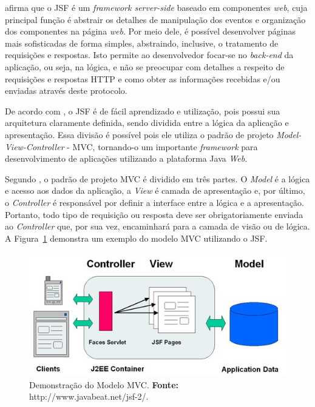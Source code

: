 \par {} afirma que o JSF é um
\textit{framework server-side} baseado em componentes \textit{web}, cuja principal função é abstrair os detalhes de manipulação dos eventos e organização dos componentes na página \textit{web}. 
Por meio dele, é possível desenvolver páginas mais sofisticadas de forma
simples, abstraindo, inclusive, o tratamento de requisições e respostas. Isto permite ao desenvolvedor focar-se no \textit{back-end} da aplicação, ou seja, na lógica, e não se preocupar com detalhes a respeito de requisições e respostas HTTP e como obter as informações recebidas e/ou enviadas através deste protocolo.

\par De acordo com , o
JSF é de fácil aprendizado e utilização, pois possui sua arquitetura claramente definida, sendo dividida entre a lógica da aplicação e apresentação. Essa divisão é possível pois ele utiliza o padrão de projeto \textit{Model-View-Controller} - MVC\footnotemark[3], tornando-o um importante \textit{framework} para desenvolvimento de aplicações utilizando a plataforma Java \textit{Web}.


\par Segundo , 
o padrão de projeto MVC é dividido em três partes. O \textit{Model} é a lógica e
acesso aos dados da aplicação, a \textit{View} é camada de apresentação e, por último, o \textit{Controller} é responsável por definir a interface entre a lógica e a apresentação. Portanto, todo tipo de requisição ou resposta deve ser obrigatoriamente enviada 
ao \textit{Controller} que, por sua vez, encaminhará para a camada de visão ou de lógica. A Figura~\ref{fig:modelo_mvc} demonstra 
um exemplo do modelo MVC utilizando o JSF.


\begin{figure}[h!]
	\centerline{\includegraphics[scale=0.5]{./imagens/jsf_using_mvc.jpg}}
	\caption[Demonstração do Modelo MVC]
	{Demonstração do Modelo MVC. \textbf{Fonte:}
	http://www.javabeat.net/jsf-2/.}
	\label{fig:modelo_mvc}
\end{figure}


